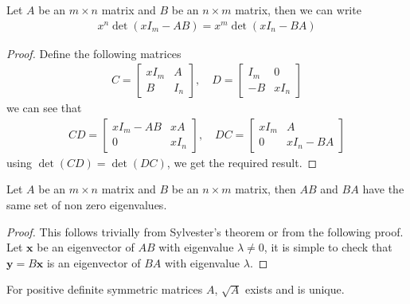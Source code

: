 \documentclass{math}
\renewcommand{\vec}[1]{\boldsymbol{#1}}
\begin{document}
\begin{theorem}
    Let $A$ be an $m \times n$ matrix and $B$ be an $n \times m$ matrix, then we can write
    \begin{align*}
        x^n\det(xI_m - AB) = x^m\det(xI_n - BA)
    \end{align*}
\end{theorem}
\begin{proof}
    Define the following matrices
    \begin{align*}
        C = \begin{bmatrix}
            xI_m & A \\
            B & I_n
        \end{bmatrix},\quad
        D = \begin{bmatrix}
            I_m & 0 \\
            -B & xI_n
        \end{bmatrix}
    \end{align*}
    we can see that
    \begin{align*}
        CD = \begin{bmatrix}
            xI_m - AB & xA \\
            0 & xI_n
        \end{bmatrix},\quad
        DC = \begin{bmatrix}
            xI_m & A \\
            0 & xI_n - BA
        \end{bmatrix}
    \end{align*}
    using $\det(CD) = \det(DC)$, we get the required result.
\end{proof}

\begin{lemma}
    Let $A$ be an $m \times n$ matrix and $B$ be an $n \times m$ matrix, then $AB$ and $BA$ have the same set of non zero eigenvalues.
\end{lemma}
\begin{proof}
    This follows trivially from Sylvester's theorem or from the following proof.
    Let $\vec{x}$ be an eigenvector of $AB$ with eigenvalue $\lambda \neq 0$, it is simple to check that $\vec{y} = B\vec{x}$ is an eigenvector of $BA$ with eigenvalue $\lambda$.
\end{proof}

\begin{lemma}
    For positive definite symmetric matrices $A$, $\sqrt{A}$ exists and is unique.
\end{lemma}
\end{document}

